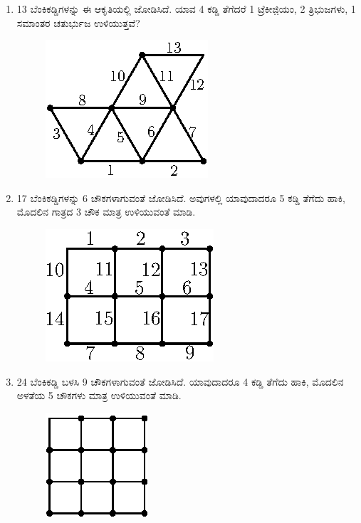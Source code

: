 \begin{enumerate}
\item 13 ಬೆಂಕಿಕಡ್ಡಿಗಳನ್ನು ಈ ಆಕೃತಿಯಲ್ಲಿ ಜೋಡಿಸಿದೆ. ಯಾವ 4 ಕಡ್ಡಿ ತೆಗೆದರೆ 1 ಟ್ರೆಕೀಜಿ಼ಯಂ, 2 ತ್ರಿಭುಜಗಳು, 1 ಸಮಾಂತರ ಚತುರ್ಭುಜ ಉಳಿಯುತ್ತವೆ?

\begin{figure}[H]
\centering
\includegraphics{images/chap3/q13.eps}
\end{figure}

\item 17 ಬೆಂಕಿಕಡ್ಡಿಗಳನ್ನು 6 ಚೌಕಗಳಾಗುವಂತೆ ಜೋಡಿಸಿದೆ. ಅವುಗಳಲ್ಲಿ ಯಾವುದಾದರೂ 5 ಕಡ್ಡಿ ತೆಗೆದು ಹಾಕಿ, ಮೊದಲಿನ  ಗಾತ್ರದ 3 ಚೌಕ ಮಾತ್ರ ಉಳಿಯುವಂತೆ ಮಾಡಿ.

\begin{figure}[H]
\centering
\includegraphics{images/chap3/q14.eps}
\end{figure}

\item 24 ಬೆಂಕಿಕಡ್ಡಿ ಬಳಸಿ 9 ಚೌಕಗಳಾಗುವಂತೆ ಜೋಡಿಸಿದೆ. ಯಾವುದಾದರೂ 4 ಕಡ್ಡಿ ತೆಗೆದು ಹಾಕಿ, ಮೊದಲಿನ ಅಳತೆಯ 5 ಚೌಕಗಳು ಮಾತ್ರ ಉಳಿಯುವಂತೆ ಮಾಡಿ.

\begin{figure}[H]
\centering
\includegraphics{images/chap3/q15.eps}
\end{figure}


\end{enumerate}
